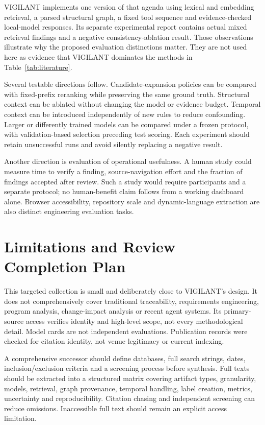 \documentclass[conference,a4paper]{IEEEtran}
\begin{document}
VIGILANT implements one version of that agenda using lexical and embedding retrieval, a parsed structural graph, a fixed tool sequence and evidence-checked local-model responses. Its separate experimental report contains actual mixed retrieval findings and a negative consistency-ablation result. Those observations illustrate why the proposed evaluation distinctions matter. They are not used here as evidence that VIGILANT dominates the methods in Table~\ref{tab:literature}.

Several testable directions follow. Candidate-expansion policies can be compared with fixed-prefix reranking while preserving the same ground truth. Structural context can be ablated without changing the model or evidence budget. Temporal context can be introduced independently of new rules to reduce confounding. Larger or differently trained models can be compared under a frozen protocol, with validation-based selection preceding test scoring. Each experiment should retain unsuccessful runs and avoid silently replacing a negative result.

Another direction is evaluation of operational usefulness. A human study could measure time to verify a finding, source-navigation effort and the fraction of findings accepted after review. Such a study would require participants and a separate protocol; no human-benefit claim follows from a working dashboard alone. Browser accessibility, repository scale and dynamic-language extraction are also distinct engineering evaluation tasks.

\section{Limitations and Review Completion Plan}
This targeted collection is small and deliberately close to VIGILANT's design. It does not comprehensively cover traditional traceability, requirements engineering, program analysis, change-impact analysis or recent agent systems. Its primary-source access verifies identity and high-level scope, not every methodological detail. Model cards are not independent evaluations. Publication records were checked for citation identity, not venue legitimacy or current indexing.

A comprehensive successor should define databases, full search strings, dates, inclusion/exclusion criteria and a screening process before synthesis. Full texts should be extracted into a structured matrix covering artifact types, granularity, models, retrieval, graph provenance, temporal handling, label creation, metrics, uncertainty and reproducibility. Citation chasing and independent screening can reduce omissions. Inaccessible full text should remain an explicit access limitation.
\end{document}
